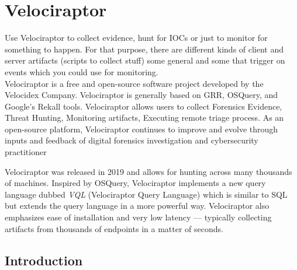 

\section{Velociraptor}
Use Velociraptor to collect evidence, hunt for IOCs or just to monitor for something to happen. For that purpose, there are different kinds of client and server artifacts (scripts to collect stuff) some general and some that trigger on events which you could use for
monitoring.\\

Velociraptor is a free and open-source software project developed by the Velocidex Company. Velociraptor is generally based on GRR, OSQuery, and Google's Rekall tools. Velociraptor allows users to collect Forensics Evidence, Threat Hunting, Monitoring artifacts, Executing remote triage process. As an open-source platform, Velociraptor continues to improve and evolve through inputs and feedback of digital forensics investigation and cybersecurity practitioner

Velociraptor was released in 2019 and allows for hunting across many thousands of machines. Inspired by OSQuery, Velociraptor implements a new query language dubbed \textit{VQL} (Velociraptor Query Language) which is similar to SQL but extends the query language in a more powerful way. Velociraptor also emphasizes ease of installation and very low latency — typically collecting artifacts from thousands of endpoints in a matter of seconds.

\subsection{Introduction}

